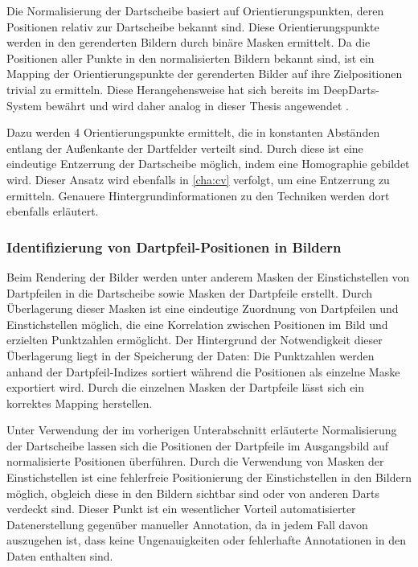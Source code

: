 Die Normalisierung der Dartscheibe basiert auf Orientierungspunkten, deren Positionen relativ zur Dartscheibe bekannt sind. Diese Orientierungspunkte werden in den gerenderten Bildern durch binäre Masken ermittelt. Da die Positionen aller Punkte in den normalisierten Bildern bekannt sind, ist ein Mapping der Orientierungspunkte der gerenderten Bilder auf ihre Zielpositionen trivial zu ermitteln. Diese Herangehensweise hat sich bereits im DeepDarts-System bewährt und wird daher analog in dieser Thesis angewendet \cite{deepdarts}.

Dazu werden 4 Orientierungspunkte ermittelt, die in konstanten Abständen entlang der Außenkante der Dartfelder verteilt sind. Durch diese ist eine eindeutige Entzerrung der Dartscheibe möglich, indem eine Homographie gebildet wird. Dieser Ansatz wird ebenfalls in \autoref{cha:cv} verfolgt, um eine Entzerrung zu ermitteln. Genauere Hintergrundinformationen zu den Techniken werden dort ebenfalls erläutert.

\subsubsection{Identifizierung von Dartpfeil-Positionen in Bildern}

Beim Rendering der Bilder werden unter anderem Masken der Einstichstellen von Dartpfeilen in die Dartscheibe sowie Masken der Dartpfeile erstellt. Durch Überlagerung dieser Masken ist eine eindeutige Zuordnung von Dartpfeilen und Einstichstellen möglich, die eine Korrelation zwischen Positionen im Bild und erzielten Punktzahlen ermöglicht. Der Hintergrund der Notwendigkeit dieser Überlagerung liegt in der Speicherung der Daten: Die Punktzahlen werden anhand der Dartpfeil-Indizes sortiert während die Positionen als einzelne Maske exportiert wird. Durch die einzelnen Masken der Dartpfeile lässt sich ein korrektes Mapping herstellen.

Unter Verwendung der im vorherigen Unterabschnitt erläuterte Normalisierung der Dartscheibe lassen sich die Positionen der Dartpfeile im Ausgangsbild auf normalisierte Positionen überführen. Durch die Verwendung von Masken der Einstichstellen ist eine fehlerfreie Positionierung der Einstichstellen in den Bildern möglich, obgleich diese in den Bildern sichtbar sind oder von anderen Darts verdeckt sind. Dieser Punkt ist ein wesentlicher Vorteil automatisierter Datenerstellung gegenüber manueller Annotation, da in jedem Fall davon auszugehen ist, dass keine Ungenauigkeiten oder fehlerhafte Annotationen in den Daten enthalten sind.


